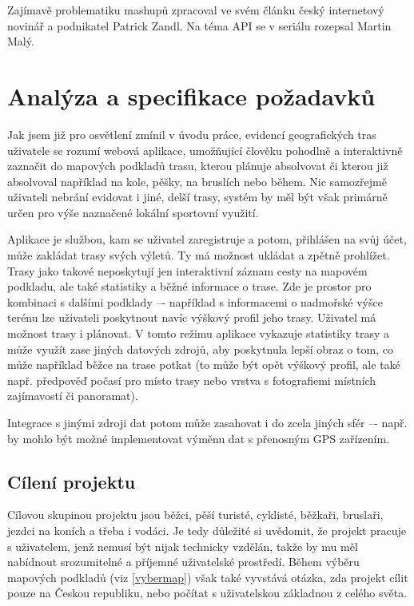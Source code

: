 Zajímavě problematiku mashupů zpracoval ve svém článku
\cite{certodejMashup} český internetový novinář a podnikatel Patrick
Zandl. Na téma API se v seriálu \cite{misantropApi} rozepsal Martin
Malý.

\chapter{Analýza a specifikace požadavků}

Jak jsem již pro osvětlení zmínil v úvodu práce, evidencí
geografických tras uživatele se rozumí webová aplikace, umožňující
člověku pohodlně a interaktivně zaznačit do mapových podkladů trasu,
kterou plánuje absolvovat či kterou již absolvoval například na kole,
pěšky, na bruslích nebo během. Nic samozřejmě uživateli nebrání
evidovat i jiné, delší trasy, systém by měl být však primárně určen
pro výše naznačené lokální sportovní využití.

Aplikace je službou, kam se uživatel zaregistruje a potom,
přihlášen na svůj účet, může zakládat trasy svých výletů. Ty má
možnost ukládat a zpětně prohlížet. Trasy jako takové neposkytují jen
interaktivní záznam cesty na mapovém podkladu, ale také statistiky a
běžné informace o trase. Zde je prostor pro kombinaci s dalšími
podklady –- například s informacemi o nadmořské výšce terénu lze
uživateli poskytnout navíc výškový profil jeho trasy. Uživatel má
možnost trasy i plánovat. V tomto režimu aplikace vykazuje statistiky
trasy a může využít zase jiných datových zdrojů, aby poskytnula lepší
obraz o tom, co může například běžce na trase potkat (to může být
opět výškový profil, ale také např. předpověď počasí pro místo trasy
nebo vrstva s fotografiemi místních zajímavostí či panoramat).

Integrace s jinými zdroji dat potom může zasahovat i do zcela jiných
sfér –- např. by mohlo být možné implementovat výměnu dat s přenosným
GPS zařízením.

\section{Cílení projektu}
Cílovou skupinou projektu jsou běžci, pěší turisté, cyklisté,
běžkaři, bruslaři, jezdci na koních a třeba i vodáci. Je tedy
důležité si uvědomit, že projekt pracuje s uživatelem, jenž nemusí
být nijak technicky vzdělán, takže by mu měl nabídnout srozumitelné a
příjemné uživatelské prostředí. Během výběru mapových podkladů (viz
\ref{vybermap}) však také vyvstává otázka, zda projekt cílit pouze na
Českou republiku, nebo počítat s uživatelskou základnou z celého světa.

